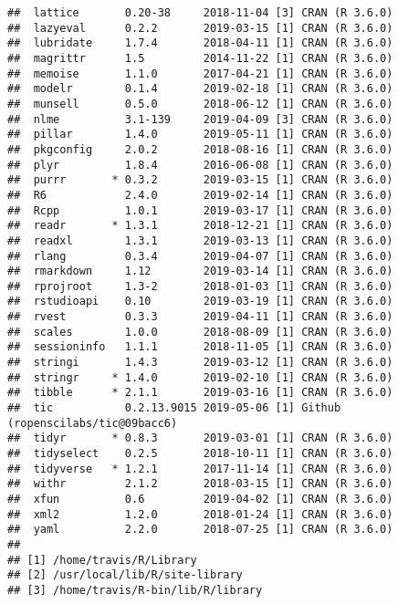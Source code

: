 \documentclass[]{book}
\begin{document}
\begin{verbatim}
##  lattice       0.20-38     2018-11-04 [3] CRAN (R 3.6.0)                   
##  lazyeval      0.2.2       2019-03-15 [1] CRAN (R 3.6.0)                   
##  lubridate     1.7.4       2018-04-11 [1] CRAN (R 3.6.0)                   
##  magrittr      1.5         2014-11-22 [1] CRAN (R 3.6.0)                   
##  memoise       1.1.0       2017-04-21 [1] CRAN (R 3.6.0)                   
##  modelr        0.1.4       2019-02-18 [1] CRAN (R 3.6.0)                   
##  munsell       0.5.0       2018-06-12 [1] CRAN (R 3.6.0)                   
##  nlme          3.1-139     2019-04-09 [3] CRAN (R 3.6.0)                   
##  pillar        1.4.0       2019-05-11 [1] CRAN (R 3.6.0)                   
##  pkgconfig     2.0.2       2018-08-16 [1] CRAN (R 3.6.0)                   
##  plyr          1.8.4       2016-06-08 [1] CRAN (R 3.6.0)                   
##  purrr       * 0.3.2       2019-03-15 [1] CRAN (R 3.6.0)                   
##  R6            2.4.0       2019-02-14 [1] CRAN (R 3.6.0)                   
##  Rcpp          1.0.1       2019-03-17 [1] CRAN (R 3.6.0)                   
##  readr       * 1.3.1       2018-12-21 [1] CRAN (R 3.6.0)                   
##  readxl        1.3.1       2019-03-13 [1] CRAN (R 3.6.0)                   
##  rlang         0.3.4       2019-04-07 [1] CRAN (R 3.6.0)                   
##  rmarkdown     1.12        2019-03-14 [1] CRAN (R 3.6.0)                   
##  rprojroot     1.3-2       2018-01-03 [1] CRAN (R 3.6.0)                   
##  rstudioapi    0.10        2019-03-19 [1] CRAN (R 3.6.0)                   
##  rvest         0.3.3       2019-04-11 [1] CRAN (R 3.6.0)                   
##  scales        1.0.0       2018-08-09 [1] CRAN (R 3.6.0)                   
##  sessioninfo   1.1.1       2018-11-05 [1] CRAN (R 3.6.0)                   
##  stringi       1.4.3       2019-03-12 [1] CRAN (R 3.6.0)                   
##  stringr     * 1.4.0       2019-02-10 [1] CRAN (R 3.6.0)                   
##  tibble      * 2.1.1       2019-03-16 [1] CRAN (R 3.6.0)                   
##  tic           0.2.13.9015 2019-05-06 [1] Github (ropenscilabs/tic@09bacc6)
##  tidyr       * 0.8.3       2019-03-01 [1] CRAN (R 3.6.0)                   
##  tidyselect    0.2.5       2018-10-11 [1] CRAN (R 3.6.0)                   
##  tidyverse   * 1.2.1       2017-11-14 [1] CRAN (R 3.6.0)                   
##  withr         2.1.2       2018-03-15 [1] CRAN (R 3.6.0)                   
##  xfun          0.6         2019-04-02 [1] CRAN (R 3.6.0)                   
##  xml2          1.2.0       2018-01-24 [1] CRAN (R 3.6.0)                   
##  yaml          2.2.0       2018-07-25 [1] CRAN (R 3.6.0)                   
## 
## [1] /home/travis/R/Library
## [2] /usr/local/lib/R/site-library
## [3] /home/travis/R-bin/lib/R/library
\end{verbatim}
\end{document}
